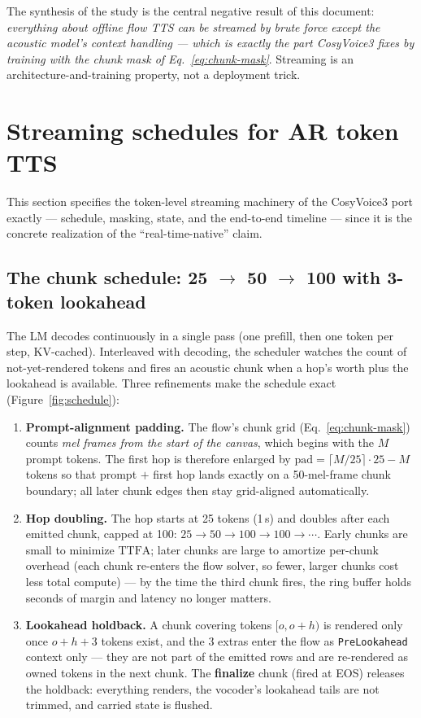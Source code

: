 \documentclass[11pt,a4paper]{article}
\newcommand{\TTFA}{\ensuremath{\mathrm{TTFA}}}
\newcommand{\code}[1]{\texttt{#1}}
\begin{document}
The synthesis of the study is the central negative result of this document:
\emph{everything about offline flow TTS can be streamed by brute force except the
acoustic model's context handling --- which is exactly the part CosyVoice3 fixes by
training with the chunk mask of Eq.~\eqref{eq:chunk-mask}}. Streaming is an
architecture-and-training property, not a deployment trick.

\section{Streaming schedules for AR token TTS}
\label{sec:streaming}

This section specifies the token-level streaming machinery of the CosyVoice3 port
exactly --- schedule, masking, state, and the end-to-end timeline --- since it is the
concrete realization of the ``real-time-native'' claim.

\subsection{The chunk schedule: 25 $\to$ 50 $\to$ 100 with 3-token lookahead}
\label{sec:schedule}

The LM decodes continuously in a single pass (one prefill, then one token per step,
KV-cached). Interleaved with decoding, the scheduler watches the count of
not-yet-rendered tokens and fires an acoustic chunk when a hop's worth plus the
lookahead is available. Three refinements make the schedule exact
(Figure~\ref{fig:schedule}):

\begin{enumerate}[leftmargin=2em]
\item \textbf{Prompt-alignment padding.} The flow's chunk grid
(Eq.~\ref{eq:chunk-mask}) counts \emph{mel frames from the start of the canvas},
which begins with the $M$ prompt tokens. The first hop is therefore enlarged by
$\mathrm{pad} = \lceil M / 25 \rceil \cdot 25 - M$ tokens so that prompt $+$ first hop
lands exactly on a 50-mel-frame chunk boundary; all later chunk edges then stay
grid-aligned automatically.
\item \textbf{Hop doubling.} The hop starts at 25 tokens (1\,s) and doubles after each
emitted chunk, capped at 100: $25 \to 50 \to 100 \to 100 \to \cdots$. Early chunks are
small to minimize \TTFA{}; later chunks are large to amortize per-chunk overhead
(each chunk re-enters the flow solver, so fewer, larger chunks cost less total compute)
--- by the time the third chunk fires, the ring buffer holds seconds of margin and
latency no longer matters.
\item \textbf{Lookahead holdback.} A chunk covering tokens $[o, o{+}h)$ is rendered
only once $o + h + 3$ tokens exist, and the 3 extras enter the flow as
\code{PreLookahead} context only --- they are not part of the emitted rows and are
re-rendered as owned tokens in the next chunk. The \textbf{finalize} chunk (fired at
EOS) releases the holdback: everything renders, the vocoder's lookahead tails are not
trimmed, and carried state is flushed.
\end{enumerate}
\end{document}

